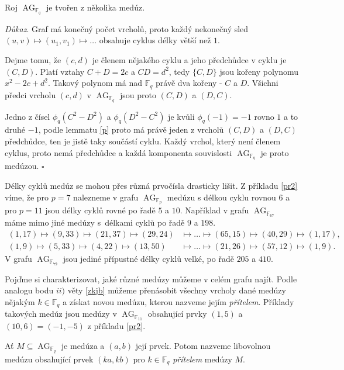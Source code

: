 \documentclass[12pt]{report}
\DeclareMathOperator{\AG}{AG}
\begin{document}
\begin{veta}\label{meduzy}
Roj $\AG_{\mathbb{F}_q}$ je tvořen z několika medúz.
\end{veta}
\noindent \textit{Důkaz}. Graf má konečný počet vrcholů, proto každý nekonečný sled $(u,v) \longmapsto (u_1,v_1) \longmapsto \dots$ obsahuje cyklus délky větší než $1$.

Dejme tomu, že $(c,d)$ je členem nějakého cyklu a jeho předchůdce v cyklu je $(C,D)$. Platí vztahy $C+D=2c$ a $CD = d^2$, tedy $\lbrace C,D \rbrace$ jsou kořeny polynomu $x^2-2c+d^2$. Takový polynom má nad $\mathbb{F}_q$ právě dva kořeny - $C$ a $D$. Všichni předci vrcholu $(c,d)$ v $\AG_{\mathbb{F}_q}$ jsou proto $(C,D)$ a $(D,C)$. 

Jedno z čísel $\phi_q (C^2 - D^2)$ a $\phi_q(D^2-C^2)$ je kvůli $\phi_q(-1)=-1$ rovno $1$ a to druhé $-1$, podle lemmatu \ref{p} proto má právě jeden z vrcholů  $(C,D)$ a $(D,C)$ předchůdce, ten je jistě taky součástí cyklu. Každý vrchol, který není členem cyklus, proto nemá předchůdce a každá komponenta souvislosti $\AG_{\mathbb{F}_q}$ je proto medúzou. \hfill $\square$\\

\begin{priklad}\label{pr3}
Délky cyklů medúz se mohou přes různá prvočísla drasticky lišit. Z příkladu \ref{pr2} víme, že pro $p = 7$ nalezneme v grafu $\AG_{\mathbb{F}_p}$ medúzu s délkou cyklu rovnou $6$ a pro $p=11$ jsou délky cyklů rovné po řadě $5$ a $10$. Například v grafu $\AG_{\mathbb{F}_{67}}$ máme mimo jiné medúzy s~délkami cyklů po řadě $9$ a $198$.
\begin{align*}
(1,17) \mapsto (9,33) \mapsto (21,37) \mapsto (29,24) &\mapsto \dots \mapsto (65,15) \mapsto (40,29) \mapsto (1,17),\\
(1,9) \mapsto (5,33) \mapsto (4,22) \mapsto (13,50) &\mapsto \dots \mapsto (21,26) \mapsto (57,12) \mapsto (1,9).
\end{align*}
V grafu $\AG_{\mathbb{F}_{79}}$ jsou jediné přípustné délky cyklů velké, po řadě $205$ a $410$.
\end{priklad}

Pojďme si charakterizovat, jaké různé medúzy můžeme v celém grafu najít. Podle analogu bodu $ii)$ věty \ref{zkjb} můžeme přenásobit všechny vrcholy dané medúzy nějakým $k \in \mathbb{F}_q$ a získat novou medúzu, kterou nazveme jejím \textit{přítelem}. Příklady takových medúz jsou medúzy v $\AG_{\mathbb{F}_{11}}$ obsahující prvky $(1,5)$ a $(10,6) = (-1,-5)$ z příkladu \ref{pr2}.
\begin{definice}
Ať $M \subseteq \AG_{\mathbb{F}_q}$ je medúza a $(a,b)$ její prvek. Potom nazveme libovolnou medúzu obsahující prvek $(ka,kb)$ pro $k \in \mathbb{F}_q$ \textit{přítelem} medúzy $M$.
\end{definice}
\end{document}
